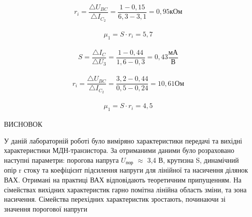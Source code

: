 \documentclass[a4paper,14pt]{extreport}
\begin{document}
\begin{align}\label{q2}
  r_i = \dfrac{\triangle U_{BC}}{\triangle I_{C_2}} =\dfrac{1-0,15}{6,3-3,1} = 0,95 \text{кОм}
\end{align}

\begin{align}\label{q3}
  \mu_1 = S\cdot r_i = 5,7
\end{align}

\begin{align}\label{q4}
  S = \dfrac{\triangle I_C}{\triangle U_{\text{3}}} = \dfrac{1-0,44}{1,6 -0,3}= 0,43 \dfrac{\text{мА}}{\text{В}}
\end{align}

\begin{align}\label{q5}
  r_i = \dfrac{\triangle U_{BC}}{\triangle I_{C_2}} = \dfrac{3,2-0,44}{0,5-0,24}= 10,61 \text{Ом}
\end{align}

\begin{align}\label{q6}
  \mu_1 = S\cdot r_i = 4,5
\end{align}






\newpage
\begin{center} ВИСНОВОК \end{center}
У даній лабораторній роботі було виміряно характеристики передачі та 
вихідні характеристики МДН-транзистора. За отриманими даними було 
розраховано наступні параметри: порогова напруга $U_{пор}$ $\approx$ 3,4 В, крутизна S, 
динамічний опір r стоку та коефіцієнт підсилення напруги для лінійної 
та насичення ділянок ВАХ.
Отримані на практиці ВАХ відповідають теоретичним припущенням. На 
сімействах вихідних характеристик гарно помітна лінійна область зміни, та 
зона насичення. Сімейства перехідних характеристик зростають, починаючи зі 
значення порогової напруги





\end{document}
